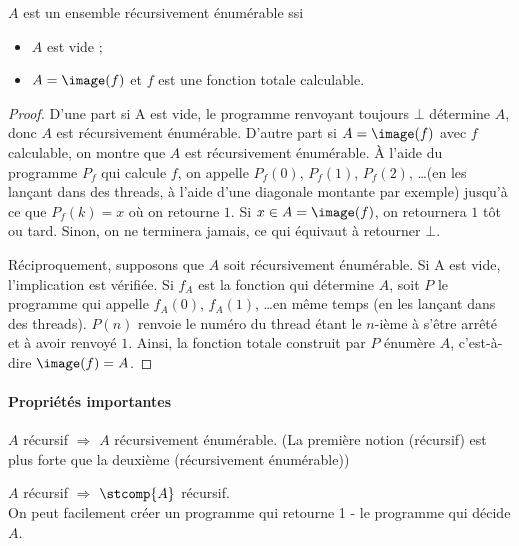 \begin{myprop}
	$A$ est un ensemble récursivement énumérable ssi
    \begin{itemize}
      \item $A$ est vide ;
      \item $A = \image(f)$ et $f$ est une fonction totale calculable.
    \end{itemize}

    \begin{proof}
      D'une part si A est vide, le programme renvoyant toujours $\bot$ détermine $A$, donc $A$ est récursivement énumérable.
      D'autre part si $A=\image(f)$ avec $f$ calculable, on montre que $A$ est récursivement énumérable. À l'aide du programme $P_f$ qui calcule $f$,
      on appelle $P_f(0)$, $P_f(1)$, $P_f(2)$, \dots (en les lançant dans des threads, à l'aide d'une diagonale montante par exemple)
      jusqu'à ce que $P_f(k) = x$ où on retourne $1$. Si $x \in A=\image(f)$, on retournera $1$ tôt ou tard. Sinon, on ne terminera jamais,
      ce qui équivaut à retourner $\bot$.

      Réciproquement, supposons que $A$ soit récursivement énumérable. Si A est vide, l'implication est vérifiée. Si $f_A$ est la fonction
      qui détermine $A$, soit $P$ le programme qui appelle $f_A(0)$, $f_A(1)$, \dots en même temps (en les lançant dans des threads).
      $P(n)$ renvoie le numéro du thread étant le $n$-ième à s'être arrêté et à avoir renvoyé $1$. Ainsi, la fonction totale construit
      par $P$ énumère $A$, c'est-à-dire $\image(f) =A$.
    \end{proof}
\end{myprop}


\paragraph{Propriétés importantes}
\label{par:propri_t_s_importantes}
\begin{myprop}
\label{prop:recursif_implique_recursivement_enumerable}
	$A$ récursif $\Rightarrow$ $A$ récursivement énumérable. (La première notion (récursif) est plus forte que la deuxième (récursivement énumérable))
\end{myprop}

\begin{myprop}
	$A$ récursif $\Rightarrow$ $\stcomp{A}$ récursif.\\ On peut facilement créer
		un programme qui retourne 1 - le programme qui décide $A$.
\end{myprop}

